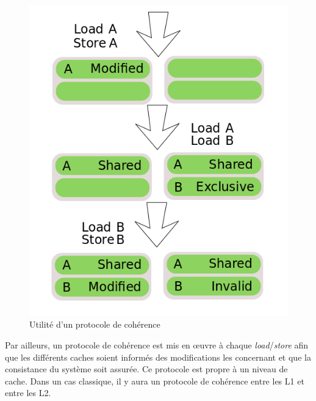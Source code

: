 \begin{figure}[H]
\begin{center}
   \includegraphics[scale=0.35]{images/learn_mesi_2.png}
   \caption{\label{img:mesi} Utilité d'un protocole de cohérence}
\end{center}
\end{figure}

Par ailleurs, un protocole de cohérence est mis en {\oe}uvre à chaque \textit{load}/\textit{store} afin que les différents caches soient informés des modifications les concernant et que la consistance du système soit assurée. Ce protocole est propre à un niveau de cache. Dans un cas classique, il y aura un protocole de cohérence entre les L1 et entre les L2.

